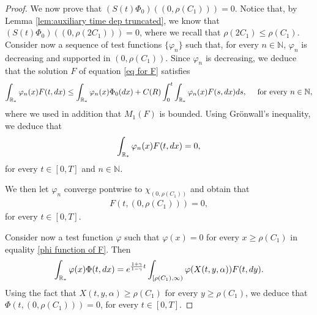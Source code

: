 \documentclass[11pt]{article}
\numberwithin{equation}{section}
\theoremstyle{plain}
\newcommand{\der}{\textup{d}}
\begin{document}
\begin{proof}
We now prove that $\left(S(t) \Phi_0 \right) ((0, \rho(C_1)))=0$. 
Notice that, by Lemma \ref{lem:auxiliary time dep truncated}, we know that $\left(S(t) \Phi_0 \right) ((0, \rho(2C_{1})))=0$, where we recall that $\rho( 2 C_1) \leq \rho(C_1)$. 
Consider now a sequence of test functions $ \{\varphi_n \}$ such that, for every $n\in\mathbb{N}$, $\varphi_{n}$ is decreasing and supported in $(0, \rho(C_1))$. Since $\varphi_n $ is decreasing, we deduce that the solution $F$ of equation \eqref{eq for F} satisfies 
\begin{align*} 
 \int_{\mathbb R_*} \varphi_n(x) F(t, \der x ) \leq \int_{\mathbb R_*} \varphi_n(x) \Phi_{0}(\der x )+ C(R)  \int_{0}^{t} \int_{\mathbb R_*} \varphi_n(x) F(s, \der x ) \der s, \quad \text{ for every } n \in \mathbb N, 
\end{align*} 
where we used in addition that $M_{1}(F)$ is bounded. Using Gr\"onwall’s inequality, we deduce that
\begin{align*}
    \int_{\mathbb R_*} \varphi_n(x) F(t, \der x ) =0,
\end{align*}
for every $t\in[0,T]$ and $n\in\mathbb{N}$.


We then let $\varphi_{n}$ converge pontwise to $\chi_{(0, \rho(C_1))}$ and obtain that
\begin{align*}
F(t, (0, \rho(C_1))) =0,
\end{align*}
for every $t\in[0,T]$.

Consider now a test function $\varphi$ such that $\varphi(x)=0$ for every $x \geq \rho(C_1)$ in equality \eqref{phi function of F}. Then 
\[
\int_{\mathbb R_* }\varphi(x) \Phi(t, \der x )= e^{\frac{1+\gamma}{1-\gamma}t} \int_{[\rho(C_1), \infty) }\varphi(X(t, y, \alpha) ) F(t, \der y). 
\] 
Using the fact that $X(t, y, \alpha) \geq \rho(C_1)$ for every $y \geq \rho(C_1)$, we deduce that 
$\Phi(t, (0, \rho(C_1)))=0$, for every $t \in [0, T]$. 


\end{proof}
\end{document}
